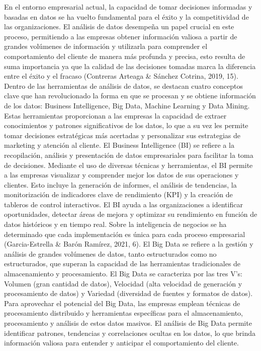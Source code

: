 En el entorno empresarial actual, la capacidad de tomar decisiones informadas y basadas en datos se ha vuelto fundamental para el éxito y la competitividad de las organizaciones. El análisis de datos desempeña un papel crucial en este proceso, permitiendo a las empresas obtener información valiosa a partir de grandes volúmenes de información y utilizarla para comprender el comportamiento del cliente de manera más profunda y precisa, esto resulta de suma importancia ya que la calidad de las decisiones tomadas marca la diferencia entre el éxito y el fracaso (Contreras Arteaga \& Sánchez Cotrina, 2019, 15). 
Dentro de las herramientas de análisis de datos, se destacan cuatro conceptos clave que han revolucionado la forma en que se procesan y se obtiene información de los datos: Business Intelligence, Big Data, Machine Learning y Data Mining. Estas herramientas proporcionan a las empresas la capacidad de extraer conocimientos y patrones significativos de los datos, lo que a su vez les permite tomar decisiones estratégicas más acertadas y personalizar sus estrategias de marketing y atención al cliente. 
El Business Intelligence (BI) se refiere a la recopilación, análisis y presentación de datos empresariales para facilitar la toma de decisiones. Mediante el uso de diversas técnicas y herramientas, el BI permite a las empresas visualizar y comprender mejor los datos de sus operaciones y clientes. Esto incluye la generación de informes, el análisis de tendencias, la monitorización de indicadores clave de rendimiento (KPI) y la creación de tableros de control interactivos. El BI ayuda a las organizaciones a identificar oportunidades, detectar áreas de mejora y optimizar su rendimiento en función de datos históricos y en tiempo real. Sobre la inteligencia de negocios se ha determinado que cada implementación es única para cada proceso empresarial (Garcia-Estrella \& Barón Ramírez, 2021, 6). 
El Big Data se refiere a la gestión y análisis de grandes volúmenes de datos, tanto estructurados como no estructurados, que superan la capacidad de las herramientas tradicionales de almacenamiento y procesamiento. El Big Data se caracteriza por las tres V's: Volumen (gran cantidad de datos), Velocidad (alta velocidad de generación y procesamiento de datos) y Variedad (diversidad de fuentes y formatos de datos). Para aprovechar el potencial del Big Data, las empresas emplean técnicas de procesamiento distribuido y herramientas específicas para el almacenamiento, procesamiento y análisis de estos datos masivos. El análisis de Big Data permite identificar patrones, tendencias y correlaciones ocultas en los datos, lo que brinda información valiosa para entender y anticipar el comportamiento del cliente. 

